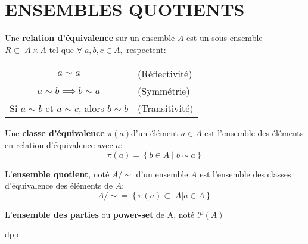 \section*{ENSEMBLES QUOTIENTS}
\begin{definition}
Une \textbf{relation d'équivalence} sur un ensemble $A$ est un sous-ensemble $R \subset\; A\times A$ tel que 
$\forall\; a,b,c\in A,$ respectent: 
\begin{table}[htpb]
    \centering
    \begin{tabular}{c l}
    $a\sim a$ & (Réflectivité)\\
    $a\sim b \implies b\sim a$ & (Symmétrie)\\
    Si  $a\sim b$ et $a\sim c$, alors $b\sim b$ & (Transitivité)
    \end{tabular}
\end{table}
\end{definition}
\begin{definition}
Une \textbf{classe d'équivalence} $\pi(a)$d'un élément $a \in A$ est l'ensemble des éléments en relation d'équivalence avec $a$:
\[
\pi(a) = \left\{ b\in A\;|\;b\sim a \right\} 
\]
\end{definition}
\begin{definition}
L'\textbf{ensemble quotient}, noté $A / \sim$ d'un ensemble $A$ est l'ensemble des classes d'équivalence des éléments de $A$: 
\[
A / \sim = \left\{ \pi(a) \subset\; A | a\in A \right\} 
\]
\end{definition}
\begin{definition}
L'\textbf{ensemble des parties} ou \textbf{power-set} de A, noté $\mathcal{P}(A)$  
\end{definition}

\begin{exo}
   
dpp

\end{exo}